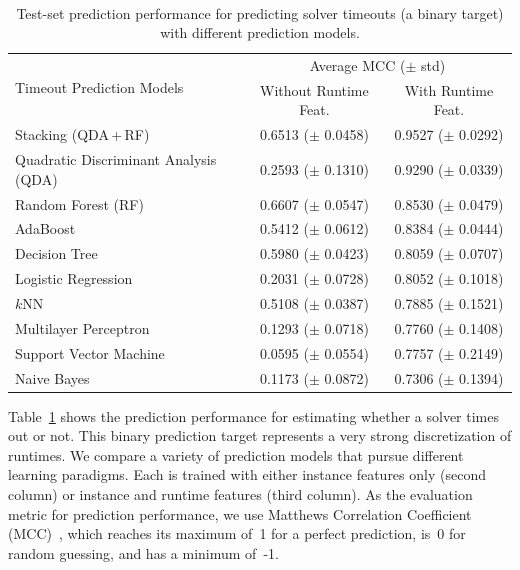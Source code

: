 \documentclass[sn-basic, Numbered]{sn-jnl} %
\begin{document}
\begin{table}[tb]
	\centering
	\caption{Test-set prediction performance for predicting solver timeouts (a binary target) with different prediction models.}
	\label{tab:timeout-prediction}
	~\\[1em]
	\begin{tabular}{lcc}
		\toprule
		\multirow[c]{2}{*}[-0.27em]{Timeout Prediction Models} & \multicolumn{2}{c}{Average MCC ($\pm$ std)} \\
		\cmidrule(lr){2-3}
		& {Without Runtime Feat.} & {With Runtime Feat.} \\
		\midrule
		Stacking (QDA\,+\,RF)                 & 0.6513 ($\pm$ 0.0458) & 0.9527 ($\pm$ 0.0292) \\[0.4ex]
		Quadratic Discriminant Analysis (QDA)                    & 0.2593 ($\pm$ 0.1310) & 0.9290 ($\pm$ 0.0339) \\[0.4ex]
		Random Forest (RF)         & 0.6607 ($\pm$ 0.0547) & 0.8530 ($\pm$ 0.0479) \\[0.4ex]
		AdaBoost                             & 0.5412 ($\pm$ 0.0612) & 0.8384 ($\pm$ 0.0444) \\[0.4ex]
		Decision Tree                         & 0.5980 ($\pm$ 0.0423) & 0.8059 ($\pm$ 0.0707) \\[0.4ex]
		Logistic Regression                   & 0.2031 ($\pm$ 0.0728) & 0.8052 ($\pm$ 0.1018) \\[0.4ex]
		$k$NN                   & 0.5108 ($\pm$ 0.0387) & 0.7885 ($\pm$ 0.1521) \\[0.4ex]
		Multilayer Perceptron                      & 0.1293 ($\pm$ 0.0718) & 0.7760 ($\pm$ 0.1408) \\[0.4ex]
		Support Vector Machine               & 0.0595 ($\pm$ 0.0554) & 0.7757 ($\pm$ 0.2149) \\[0.4ex]
		Naive Bayes                           & 0.1173 ($\pm$ 0.0872) & 0.7306 ($\pm$ 0.1394) \\
		\bottomrule
	\end{tabular}
\end{table}

Table~\ref{tab:timeout-prediction} shows the prediction performance for estimating whether a solver times out or not.
This binary prediction target represents a very strong discretization of runtimes.
We compare a variety of prediction models that pursue different learning paradigms.
Each is trained with either instance features only (second column) or instance and runtime features (third column).
As the evaluation metric for prediction performance, we use Matthews Correlation Coefficient (MCC)~\cite{gorodkin2004comparing, matthews1975comparison}, which reaches its maximum of~1 for a perfect prediction, is~0 for random guessing, and has a minimum of~-1.
\end{document}

